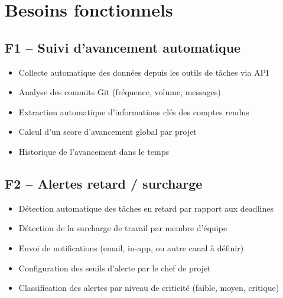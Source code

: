 \documentclass[12pt,a4paper]{article}
\begin{document}
\section{Besoins fonctionnels}

\subsection{F1 -- Suivi d'avancement automatique}
\begin{itemize}[leftmargin=2cm, itemsep=3pt]
    \item[\textcolor{accent}{$\blacktriangleright$}] Collecte automatique des donn\'ees depuis les outils de t\^aches via API
    \item[\textcolor{accent}{$\blacktriangleright$}] Analyse des commits Git (fr\'equence, volume, messages)
    \item[\textcolor{accent}{$\blacktriangleright$}] Extraction automatique d'informations cl\'es des comptes rendus
    \item[\textcolor{accent}{$\blacktriangleright$}] Calcul d'un score d'avancement global par projet
    \item[\textcolor{accent}{$\blacktriangleright$}] Historique de l'avancement dans le temps
\end{itemize}

\subsection{F2 -- Alertes retard / surcharge}
\begin{itemize}[leftmargin=2cm, itemsep=3pt]
    \item[\textcolor{accent}{$\blacktriangleright$}] D\'etection automatique des t\^aches en retard par rapport aux deadlines
    \item[\textcolor{accent}{$\blacktriangleright$}] D\'etection de la surcharge de travail par membre d'\'equipe
    \item[\textcolor{accent}{$\blacktriangleright$}] Envoi de notifications (email, in-app, ou autre canal \`a d\'efinir)
    \item[\textcolor{accent}{$\blacktriangleright$}] Configuration des seuils d'alerte par le chef de projet
    \item[\textcolor{accent}{$\blacktriangleright$}] Classification des alertes par niveau de criticit\'e (faible, moyen, critique)
\end{itemize}
\end{document}
